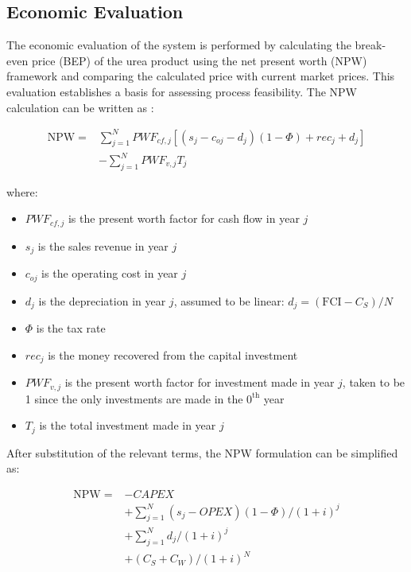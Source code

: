 \documentclass[letterpaper]{article}
\begin{document}
\subsection{Economic Evaluation}

The economic evaluation of the system is performed by calculating the
break-even price (BEP) of the urea product using the net present
worth (NPW) framework and comparing the calculated price with current
market prices. This evaluation establishes a basis for assessing
process feasibility. The NPW calculation can be written as
\cite{Peters2025PlantDesign}:

\begin{equation}
\begin{aligned}
\mathrm{NPW} ={}& \sum_{j=1}^{N} PWF_{cf,j}
\left[(s_j - c_{oj} - d_j)(1-\Phi) + rec_j + d_j\right] \\
& - \sum_{j=1}^{N} PWF_{v,j} T_j
\end{aligned}
\end{equation}

\noindent where:
\begin{itemize}
 \item $PWF_{cf,j}$ is the present worth factor for cash flow in year $j$
  \item $s_j$ is the sales revenue in year $j$
  \item $c_{oj}$ is the operating cost in year $j$
  \item $d_j$ is the depreciation in year $j$, assumed to be linear:
    $d_j = (\mathrm{FCI} - C_S) / N$
  \item $\Phi$ is the tax rate
  \item $rec_j$ is the money recovered from the capital investment
  \item $PWF_{v,j}$ is the present worth factor for investment made
    in year $j$, taken to be 1 since the only investments are made in
    the $0^{\mathrm{th}}$ year
  \item $T_j$ is the total investment made in year $j$
    \cite{Peters2025PlantDesign}
\end{itemize}

After substitution of the relevant terms, the NPW formulation can be
simplified as:

\begin{equation}
\begin{aligned}
\mathrm{NPW} ={}& - CAPEX \\
& + \sum_{j=1}^{N} (s_j - OPEX)(1-\Phi)/(1+i)^j \\
& + \sum_{j=1}^{N} d_j/(1+i)^j \\
& + (C_S + C_W)/(1+i)^N
\end{aligned}
\end{equation}
\end{document}
